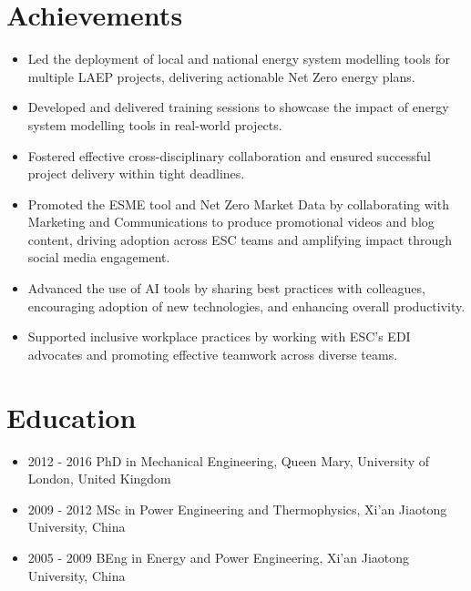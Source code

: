 \documentclass[letterpaper]{article}
\begin{document}
\section*{Achievements}
\begin{itemize}
\item Led the deployment of local and national energy system modelling tools for multiple LAEP projects, delivering actionable Net Zero energy plans.
\item Developed and delivered training sessions to showcase the impact of energy system modelling tools in real-world projects.
\item Fostered effective cross-disciplinary collaboration and ensured successful project delivery within tight deadlines.
\item Promoted the ESME tool and Net Zero Market Data by collaborating with Marketing and Communications to produce promotional videos and blog content, driving adoption across ESC teams and amplifying impact through social media engagement.
\item Advanced the use of AI tools by sharing best practices with colleagues, encouraging adoption of new technologies, and enhancing overall productivity.
\item Supported inclusive workplace practices by working with ESC's EDI advocates and promoting effective teamwork across diverse teams.
\end{itemize}

\section*{Education}
\begin{itemize}
  \item 2012 - 2016 \hspace{2pt} PhD in Mechanical Engineering, Queen Mary, University of London, United Kingdom
  \item 2009 - 2012 \hspace{2pt} MSc in Power Engineering and Thermophysics, Xi’an Jiaotong University, China
  \item 2005 - 2009 \hspace{2pt} BEng in Energy and Power Engineering, Xi’an Jiaotong University, China
\end{itemize}
\end{document}

